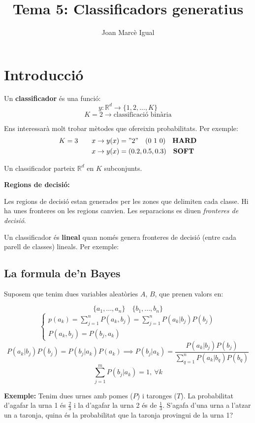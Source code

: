 \documentclass[a4paper]{article}
\title{Tema 5: Classificadors generatius}
\author{Joan Marcè Igual}
\begin{document}
	
\maketitle

\section{Introducció}

Un \textbf{classificador} és una funció:
$$
y:\mathbb{R}^d \rightarrow \{ 1,2,...,K \}
$$
$$
K = 2 \rightarrow \text{classificació binària}
$$

Ens interessarà molt trobar mètodes que ofereixin probabilitats. Per exemple:
\begin{align*}
	K = 3 \qquad &x \rightarrow y(x) = "2" \quad (0\ 1\ 0) \quad \text{\textbf{HARD}}\\
	& x \rightarrow y(x) = (0.2, 0.5, 0.3) \quad \text{\textbf{SOFT}}
\end{align*}

Un classificador parteix $\mathbb{R}^d$ en $K$ subconjunts. 

\textbf{Regions de decisió:}


Les regions de decisió estan generades per les zones que delimiten cada classe. Hi ha unes fronteres on les regions canvien. Les separacions es diuen \emph{fronteres de decisió}.

Un classificador és \textbf{lineal} quan només genera fronteres de decisió (entre cada parell de classes) lineals. Per exemple:


\subsection{La formula de'n Bayes}

Suposem que tenim dues variables aleatòries $A$, $B$, que prenen valors en:

$$
\{ a_1, ..., a_n \}\quad \{ b_1, ..., b_n \}
$$
$$
\begin{cases}
p(a_k) = \sum_{j=1}^n P(a_k, b_j) = \sum_{j=1}^n P(a_k | b_j) P(b_j) \\
P(a_k, b_j) = P(b_j, a_k)
\end{cases}
$$
$$
P(a_k | b_j) P(b_j) = P(b_j | a_k) P(a_k) \implies
\boxed{P(b_j | a_k) = \frac{P(a_k | b_j) P(b_j)}{\sum_{q=1}^n P(a_k | b_q) P(b_q)}}
$$
$$
\sum_{j=1}^m P(b_j | a_k) = 1,\ \forall k 
$$

\textbf{Exemple:} Tenim dues urnes amb pomes ($P$) i taronges ($T$). La probabilitat d'agafar la urna 1 és $\frac{2}{3}$ i la d'agafar la urna 2 és de $\frac{1}{3}$. S'agafa d'una urna a l'atzar un a taronja, quina és la probabilitat que la taronja provingui de la urna 1?
\end{document}
